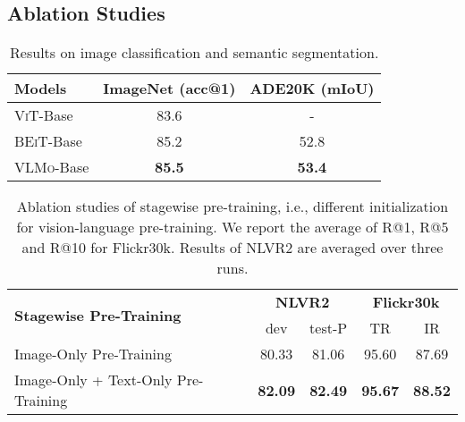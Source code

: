 \documentclass{article}
\newcommand\our{\textsc{VLMo}}
\begin{document}
\subsection{Ablation Studies}
\label{sec:ablation}


\begin{table*}[ht]
\centering
\small
\begin{tabular}{lcc}
\toprule
\bf Models & \bf ImageNet (acc@1) & \bf ADE20K (mIoU) \\ \midrule
\textsc{ViT}-Base & 83.6 & - \\ 
\textsc{BEiT}-Base & 85.2 & 52.8 \\ 
\our{}-Base & \bf 85.5 & \bf 53.4 \\
\bottomrule
\end{tabular}
\caption{Results on image classification and semantic segmentation.}
\label{tbl:unimodal_tasks}
\end{table*}


\begin{table*}[t]
\centering
\small
\begin{tabular}{lcccc}
\toprule
\multirow{2}{*}{\bf Stagewise Pre-Training} &  \multicolumn{2}{c}{\bf NLVR2} & \multicolumn{2}{c}{\bf Flickr30k} \\
 & dev & test-P & TR & IR \\
\midrule
Image-Only Pre-Training & 80.33 & 81.06 & 95.60 & 87.69 \\
Image-Only + Text-Only Pre-Training & \bf 82.09 & \bf 82.49 & \bf 95.67 & \bf 88.52 \\
\bottomrule
\end{tabular}
\caption{
Ablation studies of stagewise pre-training, i.e., different initialization for vision-language pre-training.
We report the average of R@1, R@5 and R@10 for Flickr30k.
Results of NLVR2 are averaged over three runs.
}
\label{tbl:ablation:init_models}
\end{table*}
\end{document}
